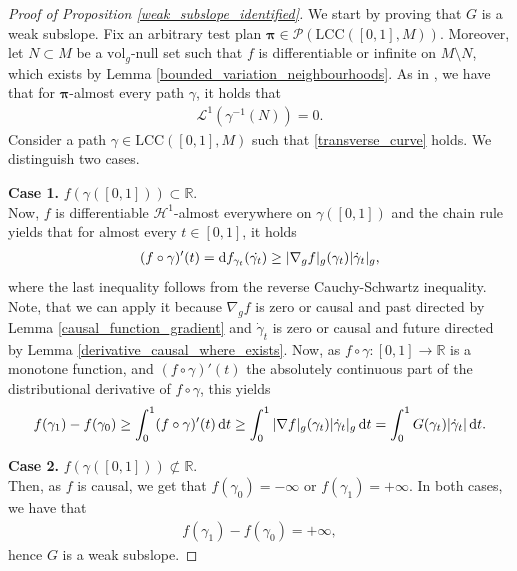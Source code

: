 \documentclass[a4paper,10pt]{article}
\numberwithin{equation}{section}
\newcommand{\R}{\mathbb{R}}
\newcommand{\vol}{\mathrm{vol}}
\newcommand{\di}{{\rm d}}
\begin{document}
\begin{proof}[Proof of Proposition \ref{weak_subslope_identified}]
    We start by proving that $G$ is a weak subslope. Fix an arbitrary test plan $\boldsymbol{\pi} \in \mathcal{P}(\mathrm{LCC}([0,1], M))$. Moreover, let $N \subset M$ be a $\vol_g$-null set such that $f$ is differentiable or infinite on $M \setminus N$, which exists by Lemma \ref{bounded_variation_neighbourhoods}. 
    As in \cite[Lemma 3.5]{ryborz2025infinitesimal}, we have that for $\boldsymbol{\pi}$-almost every path $\gamma$, it holds that
    \begin{align}\label{transverse_curve}
        \mathcal{L}^1(\gamma^{-1}(N))=0.
    \end{align}
     Consider a path $\gamma \in \mathrm{LCC}([0,1], M)$ such that \eqref{transverse_curve} holds. We distinguish two cases. 

     \textbf{Case 1.} $f(\gamma([0,1]))\subset \R$. \\
     Now, $f$ is differentiable $\mathcal{H}^1$-almost everywhere on $\gamma([0,1])$ and the chain rule yields that for almost every $t \in [0,1]$, it holds
     \begin{align}
         (f \circ \gamma)'(t) = \di f_{\gamma_t}(\dot{\gamma_t}) \geq |\nabla_g f|_g (\gamma_t)|\dot{\gamma}_t|_g,
     \end{align}
     where the last inequality follows from the reverse Cauchy-Schwartz inequality. Note, that we can apply it because $\nabla_g f$ is zero or causal and past directed by Lemma \ref{causal_function_gradient} and $\dot{\gamma}_t$ is zero or causal and future directed by Lemma \ref{derivative_causal_where_exists}. Now, as $f \circ \gamma\colon [0,1] \to \R$ is a monotone function, and $(f \circ \gamma)'(t)$ the absolutely continuous part of the distributional derivative of $f\circ \gamma$, this yields 
     \begin{align}
         f(\gamma_1)-f(\gamma_0) \geq \int_0^1 (f \circ \gamma)'(t) \, \di t \geq \int_0^1 |\nabla f|_g(\gamma_t) |\dot{\gamma}_t|_g \, \di t = \int_0^1 G(\gamma_t) |\dot{\gamma}_t| \, \di t.
     \end{align}

     \textbf{Case 2.} $f(\gamma([0,1])) \not \subset \R$. \\
     Then, as $f$ is causal, we get that $f(\gamma_0) = - \infty$ or $f(\gamma_1) = +\infty$. In both cases, we have that 
     \begin{align*}
         f(\gamma_1)-f(\gamma_0) = +\infty,
     \end{align*}
     hence $G$ is a weak subslope. 


\end{proof}
\end{document}
